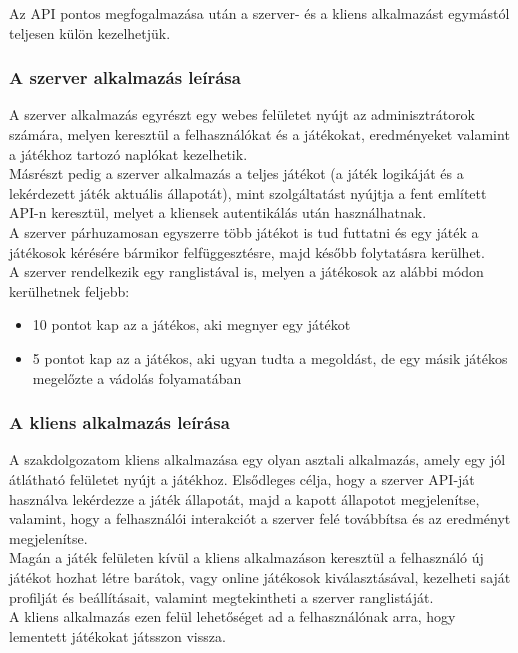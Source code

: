 Az API pontos megfogalmazása után a szerver- és a kliens alkalmazást egymástól
teljesen külön kezelhetjük.

\subsubsection{A szerver alkalmazás leírása}
A szerver alkalmazás egyrészt egy webes felületet nyújt az adminisztrátorok számára,
melyen keresztül a felhasználókat és a játékokat, eredményeket valamint a játékhoz
tartozó naplókat kezelhetik. \\
Másrészt pedig a szerver alkalmazás a teljes játékot (a játék logikáját és a
lekérdezett játék aktuális állapotát), mint szolgáltatást nyújtja a fent említett
API-n keresztül, melyet a kliensek autentikálás után használhatnak. \\
A szerver párhuzamosan egyszerre több játékot is tud futtatni és egy játék a
játékosok kérésére bármikor felfüggesztésre, majd később folytatásra kerülhet.\\
A szerver rendelkezik egy ranglistával is, melyen a játékosok az alábbi módon
kerülhetnek feljebb:

\begin{itemize}
  \item 10 pontot kap az a játékos, aki megnyer egy játékot
  \item  5 pontot kap az a játékos, aki ugyan tudta a megoldást, de egy másik játékos megelőzte a vádolás folyamatában
\end{itemize}

\subsubsection{A kliens alkalmazás leírása}
A szakdolgozatom kliens alkalmazása egy olyan asztali alkalmazás, amely egy jól
átlátható felületet nyújt a játékhoz. Elsődleges célja, hogy a szerver API-ját
használva lekérdezze a játék állapotát, majd a kapott állapotot megjelenítse,
valamint, hogy a felhasználói interakciót a szerver felé továbbítsa és az
eredményt megjelenítse. \\
Magán a játék felületen kívül a kliens alkalmazáson keresztül a felhasználó
új játékot hozhat létre barátok, vagy online játékosok kiválasztásával, kezelheti
saját profilját és beállításait, valamint megtekintheti a szerver ranglistáját.\\
A kliens alkalmazás ezen felül lehetőséget ad a felhasználónak arra, hogy lementett
játékokat játsszon vissza.

\cleardoublepage
